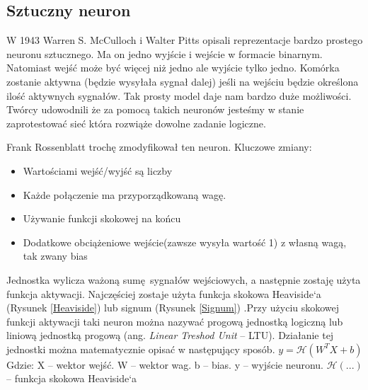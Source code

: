 \documentclass{article}
\begin{document}
\subsection{Sztuczny neuron}
W 1943 Warren S. McCulloch i Walter Pitts opisali reprezentacje bardzo prostego neuronu sztucznego. Ma on jedno wyjście i wejście w formacie binarnym. Natomiast wejść może być więcej niż jedno ale wyjście tylko jedno. Komórka zostanie aktywna (będzie wysyłała sygnał dalej) jeśli na wejściu będzie określona ilość aktywnych sygnałów.\cite{mcculloch1943logical} Tak prosty model daje nam bardzo duże możliwości. Twórcy udowodnili że za pomocą takich neuronów jesteśmy w stanie zaprotestować sieć która rozwiąże dowolne zadanie logiczne.

Frank Rossenblatt trochę zmodyfikował ten neuron.\newline
Kluczowe zmiany:
\begin{itemize}
	\item Wartościami wejść/wyjść są liczby
	\item Każde połączenie ma przyporządkowaną wagę.
	\item Używanie funkcji skokowej na końcu
	\item Dodatkowe obciążeniowe wejście(zawsze wysyła wartość 1) z własną wagą, tak zwany bias
\end{itemize}

Jednostka wylicza ważoną sumę sygnałów wejściowych, a następnie zostaję użyta funkcja aktywacji. Najczęściej zostaje użyta funkcja skokowa Heaviside`a (Rysunek \ref{Heaviside}) lub signum (Rysunek \ref{Signum}) .Przy użyciu skokowej funkcji aktywacji taki neuron można nazywać progową jednostką logiczną lub liniową jednostką progową (ang. \textit{Linear Treshod Unit} -- LTU). Działanie tej jednostki można matematycznie opisać w następujący sposób.\newline\newline
$ y = \mathcal{H}(W^{T}X + b) $\newline \newline
Gdzie: \newline
X -- wektor wejść. \newline
W -- wektor wag. \newline
b -- bias. \newline
y -- wyjście neuronu. \newline
$ \mathcal{H}(...) $ -- funkcja skokowa Heaviside`a\newline
\end{document}
